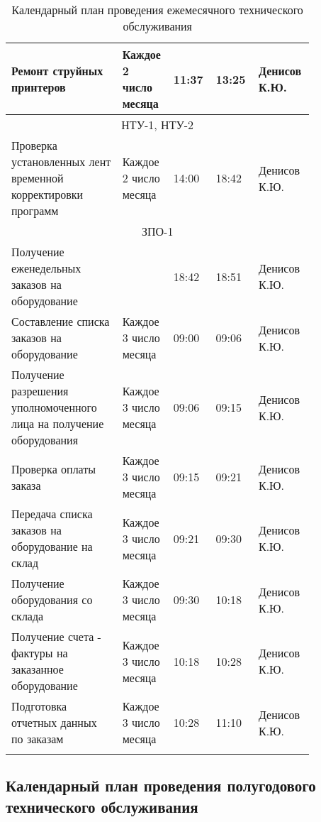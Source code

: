 \documentclass[a4paper,14pt]{extarticle}
\begin{document}
\begin{longtable}{|p{0.35\linewidth}|p{0.1\linewidth}|p{0.1\linewidth}|p{0.13\linewidth}|p{0.17\linewidth}|}
		Ремонт струйных принтеров  & Каждое 2 число месяца & 11:37 & 13:25 & Денисов К.Ю. \\ \hline
		\multicolumn{ 5}{|c|}{НТУ-1, НТУ-2} \\ \hline
		Проверка установленных лент временной корректировки программ  & Каждое 2 число месяца & 14:00 & 18:42 & Денисов К.Ю. \\ \hline
		\multicolumn{ 5}{|c|}{ЗПО-1} \\ \hline
		Получение еженедельных заказов на оборудование  &  & 18:42 & 18:51 & Денисов К.Ю. \\ \hline
		Составление списка заказов на оборудование  & Каждое 3 число месяца & 09:00 & 09:06 & Денисов К.Ю. \\ \hline
		Получение разрешения уполномоченного лица на получение оборудования  & Каждое 3 число месяца & 09:06 & 09:15 & Денисов К.Ю. \\ \hline
		Проверка оплаты заказа  & Каждое 3 число месяца & 09:15 & 09:21 & Денисов К.Ю. \\ \hline
		Передача списка заказов на оборудование на склад  & Каждое 3 число месяца & 09:21 & 09:30 & Денисов К.Ю. \\ \hline
		Получение оборудования со склада  & Каждое 3 число месяца & 09:30 & 10:18 & Денисов К.Ю. \\ \hline
		Получение счета - фактуры на заказанное оборудование  & Каждое 3 число месяца & 10:18 & 10:28 & Денисов К.Ю. \\ \hline
		Подготовка отчетных данных по заказам  & Каждое 3 число месяца & 10:28 & 11:10 & Денисов К.Ю. \\ \hline
		\caption{Календарный план проведения ежемесячного технического обслуживания}
		\label{tab:calendar-month}
	\end{longtable}



	\vspace{12ex}
\subsection*{Календарный план проведения полугодового технического обслуживания}
	\vspace{3ex}
\end{document}

